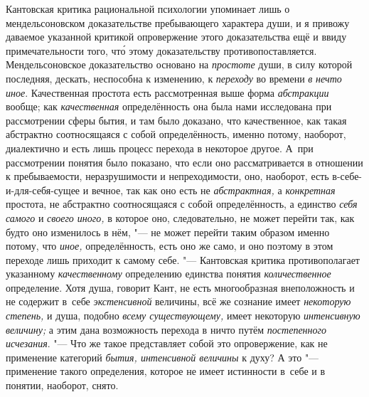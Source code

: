 Кантовская критика рациональной психологии упоминает лишь о
мендельсоновском доказательстве пребывающего характера души, и я привожу
даваемое указанной критикой опровержение этого доказательства ещё и ввиду
примечательности того, чт\'{о} этому доказательству
противопоставляется.
Мендельсоновское доказательство основано на {\em простоте} души, в
силу которой последняя, дескать, неспособна к изменению, к
{\em переходу} во времени {\em в} {\em нечто иное}.
Качественная простота есть рассмотренная выше форма
{\em абстракции} вообще; как {\em качественная}
определённость она была нами исследована при рассмотрении
сферы бытия, и там было доказано, что качественное, как такая абстрактно
соотносящаяся с собой определённость, именно потому, наоборот, диалектично
и есть лишь процесс перехода в некоторое другое. А~при рассмотрении понятия
было показано, что если оно рассматривается в отношении к пребываемости,
неразрушимости и непреходимости, оно, наоборот, есть
в-себе-и-для-себя-сущее и вечное, так как оно есть не
{\em абстрактная,} а {\em конкретная}
простота, не абстрактно соотносящаяся с собой определённость,
а единство {\em себя самого} и {\em своего иного,}
в которое оно, следовательно, не может перейти так,
как будто оно изменилось в нём, "--- не может перейти таким
образом именно потому, что {\em иное,}
определённость, есть оно же само, и оно поэтому в этом
переходе лишь приходит к самому себе. "--- Кантовская критика
противополагает указанному {\em качественному}
определению единства понятия {\em количественное}
определение. Хотя душа, говорит Кант, не есть многообразная
внеположность и не содержит в~себе {\em экстенсивной}
величины, всё же сознание имеет {\em некоторую степень,}
и душа, подобно {\em всему существующему,} имеет некоторую
{\em интенсивную величину;} а этим дана возможность перехода в ничто путём
{\em постепенного исчезания}. "---
Что же такое представляет собой это опровержение, как не
применение категорий {\em бытия, интенсивной величины} к духу? А это
"--- применение такого определения, которое не имеет истинности
в~себе и в понятии, наоборот, снято.

